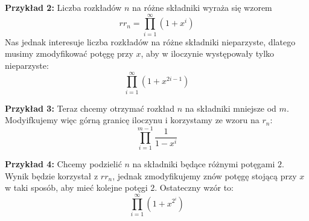 \documentclass[a4paper,12pt]{article}
\begin{document}
\noindent \textbf{Przykład 2:} Liczba rozkładów $n$ na różne składniki wyraża się wzorem
\[ rr_n = \prod\limits_{i = 1}^{\infty} (1 + x^i) \]
Nas jednak interesuje liczba rozkładów na różne składniki nieparzyste, dlatego musimy zmodyfikować potęgę przy $x$, aby w iloczynie występowały tylko nieparzyste:
\[ \prod\limits_{i = 1}^{\infty} (1 + x^{2i - 1}) \]

\noindent \textbf{Przykład 3:} Teraz chcemy otrzymać rozkład $n$ na składniki mniejsze od $m$. Modyifkujemy więc górną granicę iloczynu i korzystamy ze wzoru na $r_n$:
\[ \prod\limits_{i = 1}^{m - 1} \frac{1}{1 - x^i} \]

\noindent \textbf{Przykład 4:} Chcemy podzielić $n$ na składniki będące różnymi potęgami $2$. Wynik będzie korzystał z $rr_n$, jednak zmodyfikujemy znów potęgę stojącą przy $x$ w taki sposób, aby mieć kolejne potęgi $2$. Ostateczny wzór to:
\[ \prod\limits_{i = 1}^{\infty} (1 + x^{2^{i}}) \]
\end{document}
